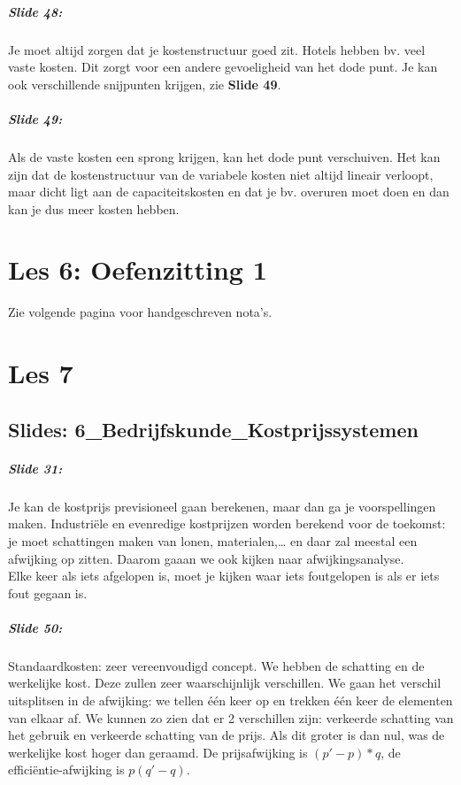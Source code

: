 \documentclass[10pt,a4paper]{report}
\begin{document}
\paragraph{Slide 48:} Je moet altijd zorgen dat je kostenstructuur goed zit. Hotels hebben bv. veel vaste kosten. Dit zorgt voor een andere gevoeligheid van het dode punt. Je kan ook verschillende snijpunten krijgen, zie \textbf{Slide 49}.

\paragraph{Slide 49:} Als de vaste kosten een sprong krijgen, kan het dode punt verschuiven. Het kan zijn dat de kostenstructuur van de variabele kosten niet altijd lineair verloopt, maar dicht ligt aan de capaciteitskosten en dat je bv. overuren moet doen en dan kan je dus meer kosten hebben.

\chapter{Les 6: Oefenzitting 1}
Zie volgende pagina voor handgeschreven nota's.

 

\chapter{Les 7}

\section{Slides: 6\_Bedrijfskunde\_Kostprijssystemen}

\paragraph{Slide 31:} Je kan de kostprijs previsioneel gaan berekenen, maar dan ga je voorspellingen maken. Industri\"ele en evenredige kostprijzen worden berekend voor de toekomst: je moet schattingen maken van lonen, materialen,… en daar zal meestal een afwijking op zitten. Daarom gaaan we ook kijken naar afwijkingsanalyse. \\
Elke keer als iets afgelopen is, moet je kijken waar iets foutgelopen is als er iets fout gegaan is.

\paragraph{Slide 50:} Standaardkosten: zeer vereenvoudigd concept. We hebben de schatting en de werkelijke kost. Deze zullen zeer waarschijnlijk verschillen. We gaan het verschil uitsplitsen in de afwijking: we tellen \'e\'en keer op en trekken \'e\'en keer de elementen van elkaar af. We kunnen zo zien dat er 2 verschillen zijn: verkeerde schatting van het gebruik en verkeerde schatting van de prijs. Als dit groter is dan nul, was de werkelijke kost hoger dan geraamd. De prijsafwijking is $(p'-p)*q$, de effici\"entie-afwijking is $p(q'-q)$.
\end{document}
